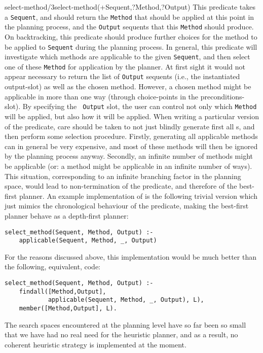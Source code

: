 \begin{predicate}{select-method/3}{select-method(+Sequent,?Method,?Output)}%
This predicate takes a {\tt Sequent}, and should return the {\tt Method}
that should be applied at this point in the planning process, and the
{\tt Output} sequents that this {\tt Method} should produce. On
backtracking, this predicate should produce further choices for the
method to be applied to {\tt Sequent} during the planning process. In
general, this predicate will investigate which methods are applicable
to the given {\tt Sequent}, and then select one of these {\tt Method}
for application by the planner. At first sight it would not appear
necessary to return the list of {\tt Output} sequents (i.e., the
instantiated output-slot) as well as the chosen method. However, a
chosen method might be applicable in more than one way (through
choice-points in the preconditions-slot). By specifying the {\tt
Output} slot, the user can control not only which {\tt Method} will be
applied, but also how it will be applied. When writing a particular
version of the  predicate, care should be taken to
not just blindly generate first all s, and then
perform some selection procedure. Firstly, generating all applicable
methods can in general be very expensive, and most of these methods
will then be ignored by the planning process anyway. Secondly, an
infinite number of methods might be applicable (or: a method might be
applicable in an infinite number of ways). This situation,
corresponding to an infinite branching factor in the planning space,
would lead to non-termination of the  predicate,
and therefore of the best-first planner. An example implementation of
 is the following trivial version which just mimics
the chronological behaviour of the  predicate, making
the best-first planner behave as a depth-first planner:
\begin{verbatim}
select_method(Sequent, Method, Output) :-
    applicable(Sequent, Method, _, Output)
\end{verbatim}
For the reasons discussed above, this implementation would be
much better than the following, equivalent, code:
\begin{verbatim}
select_method(Sequent, Method, Output) :-
    findall([Method,Output],
            applicable(Sequent, Method, _, Output), L),
    member([Method,Output], L).
\end{verbatim}
The search spaces encountered at the planning level have so far been
so small that we have had no real need for the heuristic planner, and
as a result, no coherent heuristic strategy is implemented at the
moment. 
\end{predicate}

